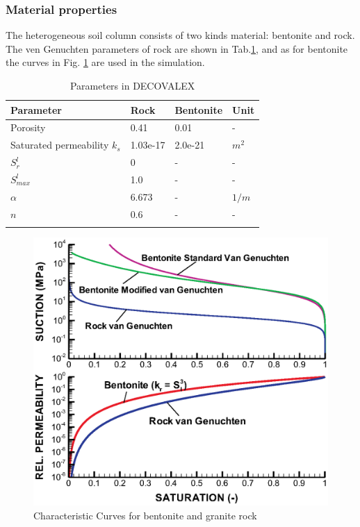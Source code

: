 \subsubsection*{Material properties}
The heterogeneous soil column consists of two kinds material:
bentonite and rock. The ven Genuchten parameters of rock are shown
in Tab.\ref{us:DECOVALEX-setting}, and as for bentonite the curves
in Fig. \ref{us:curve-DECO} are used in the simulation.
\begin{table}[H]
 \centering
 \caption{Parameters in DECOVALEX}
 \centering \label{us:DECOVALEX-setting}
 \begin{tabular}{llll}
 \hline\hline\noalign{\smallskip}
 Parameter    & Rock  &   Bentonite  &  Unit  \\ \hline
 Porosity     & 0.41  &   0.01   & -   \\
 Saturated permeability $k_s$ & 1.03e-17 & 2.0e-21 & $m^2$ \\
 $S_r^l$           & 0       &  -  & -\\
 $S_{max}^l$       & 1.0     &  -  & -\\
 $\alpha$          & 6.673   &  -  & $1/m$ \\
 $n$               & 0.6     &  -  & -\\
\noalign{\smallskip}\hline\hline \\
 \end{tabular}
\end{table}
\begin{figure} [h]
 \centering
 \includegraphics[width=0.60\columnwidth] {H_US/figures/DECOVALEXmaterial.eps}
 \caption{Characteristic Curves for bentonite and granite rock}
 \label{us:curve-DECO}
\end{figure}
%
